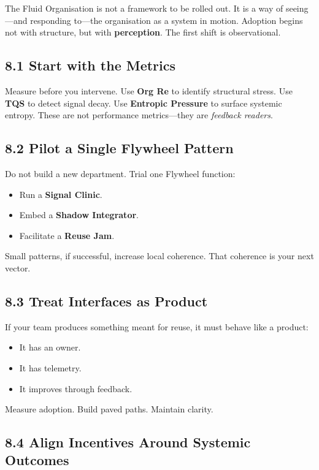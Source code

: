 \documentclass[12pt]{article}
\begin{document}
The Fluid Organisation is not a framework to be rolled out. It is a way of seeing—and responding to—the organisation as a system in motion. Adoption begins not with structure, but with \textbf{perception}. The first shift is observational.

\subsection*{8.1 Start with the Metrics}

Measure before you intervene. Use \textbf{Org Re} to identify structural stress. Use \textbf{TQS} to detect signal decay. Use \textbf{Entropic Pressure} to surface systemic entropy. These are not performance metrics—they are \textit{feedback readers}.

\subsection*{8.2 Pilot a Single Flywheel Pattern}

Do not build a new department. Trial one Flywheel function:
\begin{itemize}
    \item Run a \textbf{Signal Clinic}.
    \item Embed a \textbf{Shadow Integrator}.
    \item Facilitate a \textbf{Reuse Jam}.
\end{itemize}

Small patterns, if successful, increase local coherence. That coherence is your next vector.

\subsection*{8.3 Treat Interfaces as Product}

If your team produces something meant for reuse, it must behave like a product:
\begin{itemize}
    \item It has an owner.
    \item It has telemetry.
    \item It improves through feedback.
\end{itemize}

Measure adoption. Build paved paths. Maintain clarity.

\subsection*{8.4 Align Incentives Around Systemic Outcomes}
\end{document}
